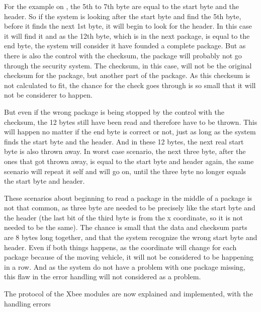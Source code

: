 For the example on , the 5th to 7th byte are equal to the start byte and the header. So if the system is looking after the start byte and find the 5th byte, before it finds the next 1st byte, it will begin to look for the header. In this case it will find it and as the 12th byte, which is in the next package, is equal to the end byte, the system will consider it have founded a complete package. But as there is also the control with the checksum, the package will probably not go through the security system. The checksum, in this case, will not be the original checksum for the package, but another part of the package. As this checksum is not calculated to fit, the chance for the check goes through is so small that it will not be considerer to happen. 

But even if the wrong package is being stopped by the control with the checksum, the 12 bytes still have been read and therefore have to be thrown. This will happen no matter if the end byte is correct or not, just as long as the system finds the start byte and the header. And in these 12 bytes, the next real start byte is also thrown away. In worst case scenario, the next three byte, after the ones that got thrown away, is equal to the start byte and header again, the same scenario will repeat it self and will go on, until the three byte no longer equals the start byte and header.

These scenarios about beginning to read a package in the middle of a package is not that common, as three byte are needed to be precisely like the start byte and the header (the last bit of the third byte is from the x coordinate, so it is not needed to be the same). The chance is small that the data and checksum parts are 8 bytes long together,  and that the system recognize the wrong start byte and header. Even if both things happens, as the coordinate will change for each package because of the moving vehicle, it will not be considered to be happening in a row. And as the system do not have a problem with one package missing, this flaw in the error handling will not considered as a problem.



The protocol of the Xbee modules are now explained and implemented, with the handling errors